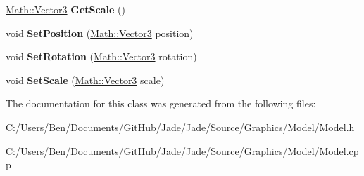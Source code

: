 \begin{DoxyCompactItemize}
\item 
\hypertarget{class_jade_1_1_graphics_1_1_model_af43d2f2dbb504f81a412cbea44287c2e}{}\hyperlink{struct_jade_1_1_math_1_1_vector3}{Math\+::\+Vector3} {\bfseries Get\+Scale} ()\label{class_jade_1_1_graphics_1_1_model_af43d2f2dbb504f81a412cbea44287c2e}

\item 
\hypertarget{class_jade_1_1_graphics_1_1_model_a561ecf24953ff9c1aadca130f04e1288}{}void {\bfseries Set\+Position} (\hyperlink{struct_jade_1_1_math_1_1_vector3}{Math\+::\+Vector3} position)\label{class_jade_1_1_graphics_1_1_model_a561ecf24953ff9c1aadca130f04e1288}

\item 
\hypertarget{class_jade_1_1_graphics_1_1_model_a516d9b2775b63c354fd85ec3bae722d5}{}void {\bfseries Set\+Rotation} (\hyperlink{struct_jade_1_1_math_1_1_vector3}{Math\+::\+Vector3} rotation)\label{class_jade_1_1_graphics_1_1_model_a516d9b2775b63c354fd85ec3bae722d5}

\item 
\hypertarget{class_jade_1_1_graphics_1_1_model_a0880e7684ca5fb5c0356db4af8109d6c}{}void {\bfseries Set\+Scale} (\hyperlink{struct_jade_1_1_math_1_1_vector3}{Math\+::\+Vector3} scale)\label{class_jade_1_1_graphics_1_1_model_a0880e7684ca5fb5c0356db4af8109d6c}

\end{DoxyCompactItemize}


The documentation for this class was generated from the following files\+:\begin{DoxyCompactItemize}
\item 
C\+:/\+Users/\+Ben/\+Documents/\+Git\+Hub/\+Jade/\+Jade/\+Source/\+Graphics/\+Model/Model.\+h\item 
C\+:/\+Users/\+Ben/\+Documents/\+Git\+Hub/\+Jade/\+Jade/\+Source/\+Graphics/\+Model/Model.\+cpp\end{DoxyCompactItemize}
